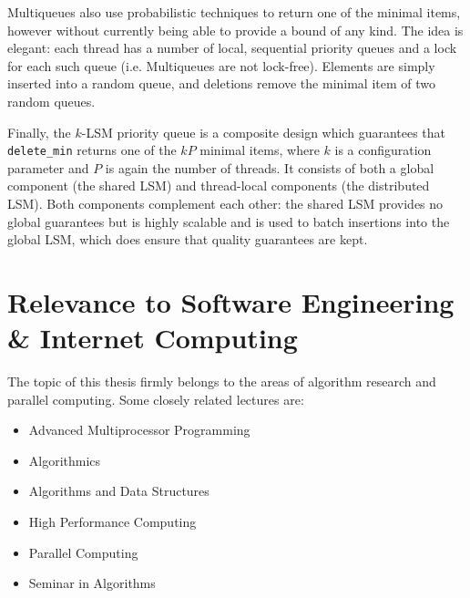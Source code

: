 \documentclass[a4paper,10pt]{article}
\begin{document}
Multiqueues \cite{rihani2014multiqueues} also use probabilistic techniques to
return one of the minimal items, however without currently being able to provide
a bound of any kind. The idea is elegant: each thread has a number of local,
sequential priority queues and a lock for each such queue (i.e. Multiqueues are not lock-free).
Elements are simply
inserted into a random queue, and deletions remove the minimal item of two random
queues.

Finally, the $k$-LSM priority queue \cite{wimmer2015lock} is a composite design
which guarantees that \lstinline|delete_min| returns one of the $kP$ minimal
items, where $k$ is a configuration parameter and $P$ is again the number of threads.
It consists of both a global component (the shared LSM) and thread-local components
(the distributed LSM). Both components complement each other: the shared LSM provides
no global guarantees but is highly scalable and is used to batch insertions into
the global LSM, which does ensure that quality guarantees are kept.

\section{Relevance to Software Engineering \& Internet Computing}

The topic of this thesis firmly belongs to the areas of algorithm research
and parallel computing. Some closely related lectures are:

\begin{itemize}
    \item Advanced Multiprocessor Programming
    \item Algorithmics
    \item Algorithms and Data Structures
    \item High Performance Computing
    \item Parallel Computing
    \item Seminar in Algorithms
\end{itemize}

\printbibliography
\end{document}
